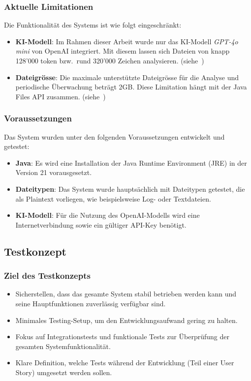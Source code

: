 \documentclass[a4paper,12pt]{report}
\begin{document}
    \subsubsection{Aktuelle Limitationen}
    Die Funktionalität des Systems ist wie folgt eingeschränkt:
    \begin{itemize}
        \item \textbf{KI-Modell}: Im Rahmen dieser Arbeit wurde nur das KI-Modell \textit{GPT-4o mini} von OpenAI integriert.
        Mit diesem lassen sich Dateien von knapp 128'000 \gls{token} bzw.\ rund 320'000 Zeichen analysieren.
        (siehe~)
        \item \textbf{Dateigrösse}: Die maximale unterstützte Dateigrösse für die Analyse und periodische Überwachung beträgt 2GB\@.
        Diese Limitation hängt mit der Java Files API zusammen.
        (siehe~)
    \end{itemize}

    \subsubsection{Voraussetzungen}
    Das System wurden unter den folgenden Voraussetzungen entwickelt und getestet:
    \begin{itemize}
        \item \textbf{Java}: Es wird eine Installation der Java Runtime Environment (JRE) in der Version 21 vorausgesetzt.
        \item \textbf{Dateitypen}: Das System wurde hauptsächlich mit Dateitypen getestet, die als Plaintext vorliegen, wie beispielsweise Log- oder Textdateien.
        \item \textbf{KI-Modell}: Für die Nutzung des OpenAI-Modells wird eine Internetverbindung sowie ein gültiger API-Key benötigt.
    \end{itemize}

    \clearpage

    \subsection{Testkonzept}

    \subsubsection{Ziel des Testkonzepts}
    \begin{itemize}
        \item Sicherstellen, dass das gesamte System stabil betrieben werden kann und seine Hauptfunktionen zuverlässig verfügbar sind.
        \item Minimales Testing-Setup, um den Entwicklungsaufwand gering zu halten.
        \item Fokus auf Integrationstests und funktionale Tests zur Überprüfung der gesamten Systemfunktionalität.
        \item Klare Definition, welche Tests während der Entwicklung (Teil einer User Story) umgesetzt werden sollen.
    \end{itemize}
\end{document}
